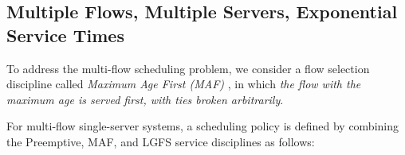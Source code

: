 


\subsection{Multiple Flows, Multiple Servers, Exponential Service Times}
%

To address the multi-flow scheduling problem, we consider a flow selection discipline called \emph{Maximum Age First  (MAF)}  \cite{LiInfocom2015,IgorAllerton2016,HsuTWC2017}, in which 
\emph{the flow with the maximum age is served first, with ties broken arbitrarily}. 

For multi-flow single-server systems, a scheduling policy is defined by combining the Preemptive, MAF, and LGFS service disciplines as follows: 



